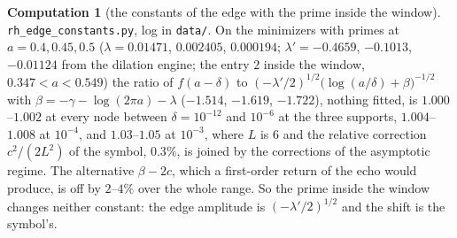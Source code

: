 \documentclass[11pt]{article}
\theoremstyle{definition}
\newtheorem{computation}[theorem]{Computation}
\theoremstyle{remark}
\begin{document}
\begin{computation}[the constants of the edge with the prime inside the window]\label{comp:edgefull}
\texttt{rh\_edge\_constants.py}, log in \texttt{data/}. On the minimizers with primes at $a=0.4,0.45,0.5$ ($\lambda=0.01471$, $0.002405$, $0.000194$; $\lambda'=-0.4659$, $-0.1013$, $-0.01124$ from the dilation engine; the entry $2$ inside the window, $0.347<a<0.549$) the ratio of $f(a-\delta)$ to $(-\lambda'/2)^{1/2}\big(\log(a/\delta)+\beta\big)^{-1/2}$ with $\beta=-\gamma-\log(2\pi a)-\lambda$ ($-1.514$, $-1.619$, $-1.722$), nothing fitted, is $1.000$--$1.002$ at every node between $\delta=10^{-12}$ and $10^{-6}$ at the three supports, $1.004$--$1.008$ at $10^{-4}$, and $1.03$--$1.05$ at $10^{-3}$, where $L$ is $6$ and the relative correction $c^2/(2L^2)$ of the symbol, $0.3\%$, is joined by the corrections of the asymptotic regime. The alternative $\beta-2c$, which a first-order return of the echo would produce, is off by $2$--$4\%$ over the whole range. So the prime inside the window changes neither constant: the edge amplitude is $(-\lambda'/2)^{1/2}$ and the shift is the symbol's.
\end{computation}
\end{document}
